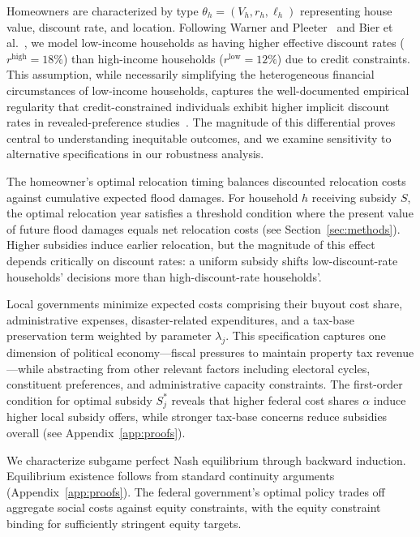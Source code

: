 \documentclass[11pt,letterpaper]{article}
\theoremstyle{definition}
\begin{document}
Homeowners are characterized by type $\theta_h = (V_h, r_h, \ell_h)$ representing house value, discount rate, and location. Following Warner and Pleeter~\cite{warner2001personal} and Bier et al.~\cite{bier2019game}, we model low-income households as having higher effective discount rates ($r^{\text{high}} = 18\%$) than high-income households ($r^{\text{low}} = 12\%$) due to credit constraints. This assumption, while necessarily simplifying the heterogeneous financial circumstances of low-income households, captures the well-documented empirical regularity that credit-constrained individuals exhibit higher implicit discount rates in revealed-preference studies~\cite{hausman1979individual, frederick2002time}. The magnitude of this differential proves central to understanding inequitable outcomes, and we examine sensitivity to alternative specifications in our robustness analysis.

The homeowner's optimal relocation timing balances discounted relocation costs against cumulative expected flood damages. For household $h$ receiving subsidy $S$, the optimal relocation year satisfies a threshold condition where the present value of future flood damages equals net relocation costs (see Section~\ref{sec:methods}). Higher subsidies induce earlier relocation, but the magnitude of this effect depends critically on discount rates: a uniform subsidy shifts low-discount-rate households' decisions more than high-discount-rate households'.

Local governments minimize expected costs comprising their buyout cost share, administrative expenses, disaster-related expenditures, and a tax-base preservation term weighted by parameter $\lambda_j$. This specification captures one dimension of political economy---fiscal pressures to maintain property tax revenue---while abstracting from other relevant factors including electoral cycles, constituent preferences, and administrative capacity constraints. The first-order condition for optimal subsidy $S_j^*$ reveals that higher federal cost shares $\alpha$ induce higher local subsidy offers, while stronger tax-base concerns reduce subsidies overall (see Appendix~\ref{app:proofs}).

We characterize subgame perfect Nash equilibrium through backward induction. Equilibrium existence follows from standard continuity arguments (Appendix~\ref{app:proofs}). The federal government's optimal policy trades off aggregate social costs against equity constraints, with the equity constraint binding for sufficiently stringent equity targets.
\end{document}
